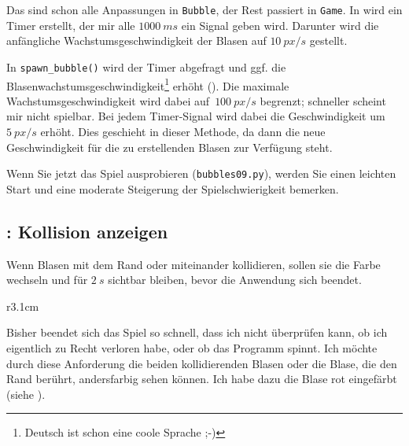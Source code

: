
Das sind schon alle Anpassungen in \texttt{Bubble}, der Rest passiert in \texttt{Game}. In  wird ein Timer erstellt, der mir alle $1000~ms$ ein Signal geben wird. Darunter wird die anfängliche Wachstumsgeschwindigkeit der Blasen auf $10~px/s$ gestellt.


In \texttt{spawn\_bubble()} wird der Timer abgefragt und ggf. die Blasenwachstumsgeschwindigkeit\footnote{Deutsch ist schon eine coole Sprache ;-)} erhöht (). Die maximale Wachstumsgeschwindigkeit wird dabei auf~$100~px/s$ begrenzt; schneller scheint mir nicht spielbar. Bei jedem Timer-Signal wird dabei die Geschwindigkeit um~$5~px/s$ erhöht. Dies geschieht in dieser Methode, da dann die neue Geschwindigkeit für die zu erstellenden Blasen zur Verfügung steht.



Wenn Sie jetzt das Spiel ausprobieren (\texttt{bubbles09.py}), werden Sie einen leichten Start und eine moderate Steigerung der Spielschwierigkeit bemerken.

\subsection{: Kollision anzeigen}
	Wenn Blasen mit dem Rand oder miteinander kollidieren, sollen sie die Farbe wechseln und für $2~s$ sichtbar bleiben, bevor die Anwendung sich beendet.
\er

\begin{wrapfigure}[6]{r}{3.1cm}%
	\begin{center}%
		\vspace{-1cm}%
	\end{center}%
\end{wrapfigure}%
Bisher beendet sich das Spiel so schnell, dass ich nicht überprüfen kann, ob ich eigentlich zu Recht verloren habe, oder ob das Programm spinnt. Ich möchte durch diese Anforderung die beiden kollidierenden Blasen oder die Blase, die den Rand berührt, andersfarbig sehen können. Ich habe dazu die Blase rot eingefärbt (siehe ). 

